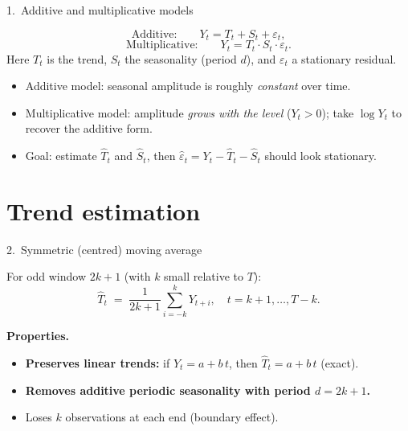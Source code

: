 \documentclass[aspectratio=169]{beamer}
\begin{document}
\begin{frame}{1.~Additive and multiplicative models}
  \begin{defbox}
    \[
      \text{Additive:}\qquad Y_t = T_t + S_t + \varepsilon_t,
    \]
    \[
      \text{Multiplicative:}\qquad Y_t = T_t \cdot S_t \cdot \varepsilon_t.
    \]
    Here $T_t$ is the trend, $S_t$ the seasonality (period $d$), and
    $\varepsilon_t$ a stationary residual.
  \end{defbox}
  \medskip
  \begin{itemize}
    \item Additive model: seasonal amplitude is roughly \emph{constant}
          over time.
    \item Multiplicative model: amplitude \emph{grows with the level}
          ($Y_t > 0$); take $\log Y_t$ to recover the additive form.
    \item Goal: estimate $\widehat{T}_t$ and $\widehat{S}_t$, then
          $\widehat{\varepsilon}_t = Y_t - \widehat{T}_t - \widehat{S}_t$
          should look stationary.
  \end{itemize}
\end{frame}

\section{Trend estimation}

\begin{frame}{2.~Symmetric (centred) moving average}
  \begin{defbox}
    For odd window $2k+1$ (with $k$ small relative to $T$):
    \[
      \widehat{T}_t \;=\; \frac{1}{2k+1}\sum_{i=-k}^{k} Y_{t+i},
      \quad t = k+1, \dots, T-k.
    \]
  \end{defbox}
  \medskip
  \textbf{Properties.}
  \begin{itemize}
    \item \textbf{Preserves linear trends:} if $Y_t = a + b\,t$, then
          $\widehat{T}_t = a + b\,t$ (exact).
    \item \textbf{Removes additive periodic seasonality with period $d = 2k+1$.}
    \item Loses $k$ observations at each end (boundary effect).
  \end{itemize}
\end{frame}
\end{document}
